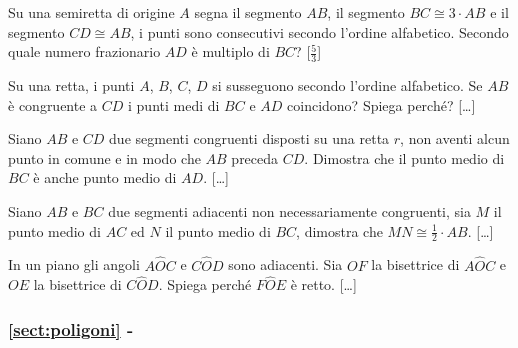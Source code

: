 \begin{multicols}{2}
 
\begin{esercizio}
\label{ese:1.84}
Su una semiretta di origine $A$ segna il segmento $AB$, il segmento 
$BC\cong 3\cdot AB$ e il segmento $CD\cong AB$, i punti sono 
consecutivi secondo l'ordine alfabetico. Secondo quale numero 
frazionario $AD$ è multiplo di $BC$?
\hfill[\(\frac{5}{3}\)]
\end{esercizio}

\begin{esercizio}
\label{ese:1.87}
Su una retta, i punti $A$, $B$, $C$, $D$ si susseguono secondo 
l'ordine alfabetico. Se $AB$ è congruente a $CD$ i punti medi di $BC$ 
e $AD$ coincidono? Spiega perché?
\hfill[\dots]
\end{esercizio}

\begin{esercizio}
\label{ese:1.89}
Siano $AB$ e $CD$ due segmenti congruenti disposti su una retta $r$, 
non aventi alcun punto in comune e in modo che $AB$ preceda $CD$. 
Dimostra che il punto medio di $BC$ è anche punto medio di $AD$.
\hfill[\dots]
\end{esercizio}

\begin{esercizio}
\label{ese:1.92}
Siano $AB$ e $BC$ due segmenti adiacenti non necessariamente 
congruenti, sia $M$ il punto medio di $AC$ ed $N$ il punto medio di 
$BC$, dimostra che $MN\cong \frac{1}{2}\cdot AB$.
\hfill[\dots]
\end{esercizio}

\begin{esercizio}
\label{ese:1.95}
In un piano gli angoli $A\widehat{O}C$ e $C\widehat{O}D$ sono 
adiacenti. Sia $OF$ la bisettrice di $A\widehat{O}C$ e $OE$ la 
bisettrice di $C\widehat{O}D$. Spiega perché $F\widehat{O}E$ è retto.
\hfill[\dots]
\end{esercizio}


\end{multicols}

\begingroup
\hypersetup{linkcolor=black}
\subsubsection*{\ref{sect:poligoni} - }
\endgroup


